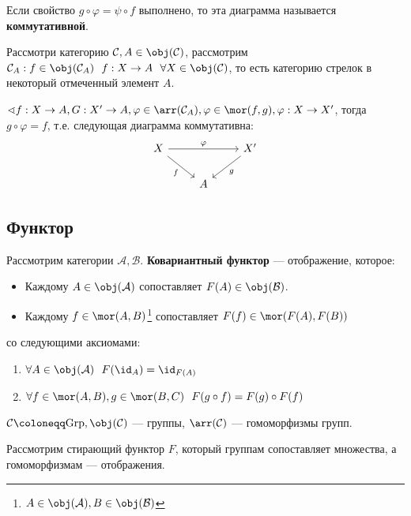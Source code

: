 Если свойство \(g \circ \varphi = \psi \circ f\) выполнено, то эта диаграмма называется \textbf{коммутативной}.

Рассмотри категорию \(\mathcal{C}, A \in \obj(\mathcal{C})\), рассмотрим \(\mathcal{C}_A : f \in \obj(\mathcal{C}_A) \ \ f : X \to A \ \ \forall X \in \obj(\mathcal{C})\), то есть категорию стрелок в некоторый отмеченный элемент \(A\).

\(\sphericalangle f : X \to A, G : X' \to A, \varphi \in \arr(\mathcal{C}_A), \varphi \in \mor(f, g), \varphi : X \to X'\), тогда \(g \circ \varphi = f\), т.е. следующая диаграмма коммутативна:
\[\begin{tikzcd}
        X \arrow[swap]{dr}{f} \arrow{rr}{\varphi} & & X' \arrow{dl}{g} \\
        & A &
    \end{tikzcd}\]

\subsection{Функтор}

\begin{definition}
    Рассмотрим категории \(\mathcal{A}, \mathcal{B}\). \textbf{Ковариантный функтор} --- отображение, которое:
    \begin{itemize}
        \item Каждому \(A \in \obj(\mathcal{A})\) сопоставляет \(F(A) \in \obj(\mathcal{B})\).
        \item Каждому \(f \in \mor(A, B)\)\footnote{\(A \in \obj(\mathcal{A}), B \in \obj(\mathcal{B})\)} сопоставляет \(F(f) \in \mor(F(A), F(B))\)
    \end{itemize}
    со следующими аксиомами:
    \begin{enumerate}
        \item \(\forall A \in \obj(\mathcal{A}) \ \ F(\id_A) = \id_{F(A)}\)
        \item \(\forall f \in \mor(A, B), g \in \mor(B, C) \ \ F(g \circ f) = F(g) \circ F(f)\)
    \end{enumerate}
\end{definition}

\begin{example}
    \(\mathcal{C} \coloneqq \mathrm{Grp}, \obj(\mathcal{C})\) --- группы, \(\arr(\mathcal{C})\) --- гомоморфизмы групп.

    Рассмотрим стирающий функтор \(F\), который группам сопоставляет множества, а гомоморфизмам --- отображения.
\end{example}

